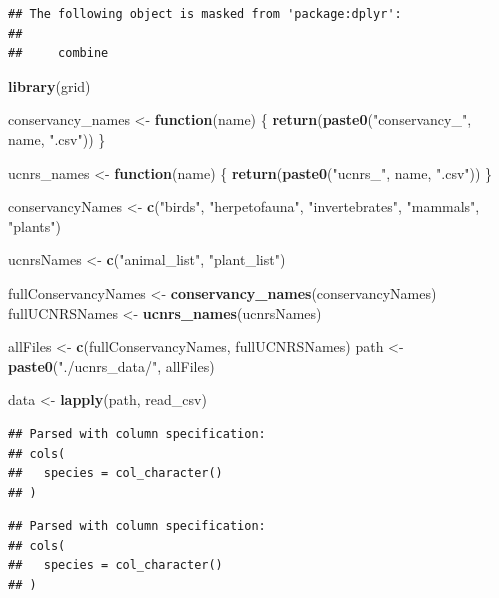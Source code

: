 \documentclass[]{article}
\newenvironment{Shaded}{\begin{snugshade}}{\end{snugshade}}
\newcommand{\KeywordTok}[1]{\textcolor[rgb]{0.13,0.29,0.53}{\textbf{#1}}}
\newcommand{\StringTok}[1]{\textcolor[rgb]{0.31,0.60,0.02}{#1}}
\newcommand{\ControlFlowTok}[1]{\textcolor[rgb]{0.13,0.29,0.53}{\textbf{#1}}}
\newcommand{\NormalTok}[1]{#1}
\begin{document}
\begin{verbatim}
## The following object is masked from 'package:dplyr':
## 
##     combine
\end{verbatim}

\begin{Shaded}
\begin{Highlighting}[]
\KeywordTok{library}\NormalTok{(grid)}

\NormalTok{conservancy_names <-}\StringTok{ }\ControlFlowTok{function}\NormalTok{(name) \{}
  \KeywordTok{return}\NormalTok{(}\KeywordTok{paste0}\NormalTok{(}\StringTok{"conservancy_"}\NormalTok{, name, }\StringTok{".csv"}\NormalTok{)) }
\NormalTok{\}}

\NormalTok{ucnrs_names <-}\StringTok{ }\ControlFlowTok{function}\NormalTok{(name) \{}
  \KeywordTok{return}\NormalTok{(}\KeywordTok{paste0}\NormalTok{(}\StringTok{"ucnrs_"}\NormalTok{, name, }\StringTok{".csv"}\NormalTok{))}
\NormalTok{\}}

\NormalTok{conservancyNames <-}\StringTok{ }\KeywordTok{c}\NormalTok{(}\StringTok{"birds"}\NormalTok{, }\StringTok{"herpetofauna"}\NormalTok{, }\StringTok{"invertebrates"}\NormalTok{, }\StringTok{"mammals"}\NormalTok{, }\StringTok{"plants"}\NormalTok{)}

\NormalTok{ucnrsNames <-}\StringTok{ }\KeywordTok{c}\NormalTok{(}\StringTok{"animal_list"}\NormalTok{, }\StringTok{"plant_list"}\NormalTok{)}

\NormalTok{fullConservancyNames <-}\StringTok{ }\KeywordTok{conservancy_names}\NormalTok{(conservancyNames)}
\NormalTok{fullUCNRSNames <-}\StringTok{ }\KeywordTok{ucnrs_names}\NormalTok{(ucnrsNames)}

\NormalTok{allFiles <-}\StringTok{ }\KeywordTok{c}\NormalTok{(fullConservancyNames, fullUCNRSNames)}
\NormalTok{path <-}\StringTok{ }\KeywordTok{paste0}\NormalTok{(}\StringTok{"./ucnrs_data/"}\NormalTok{, allFiles)}

\NormalTok{data <-}\StringTok{ }\KeywordTok{lapply}\NormalTok{(path, read_csv) }
\end{Highlighting}
\end{Shaded}

\begin{verbatim}
## Parsed with column specification:
## cols(
##   species = col_character()
## )
\end{verbatim}

\begin{verbatim}
## Parsed with column specification:
## cols(
##   species = col_character()
## )
\end{verbatim}
\end{document}

